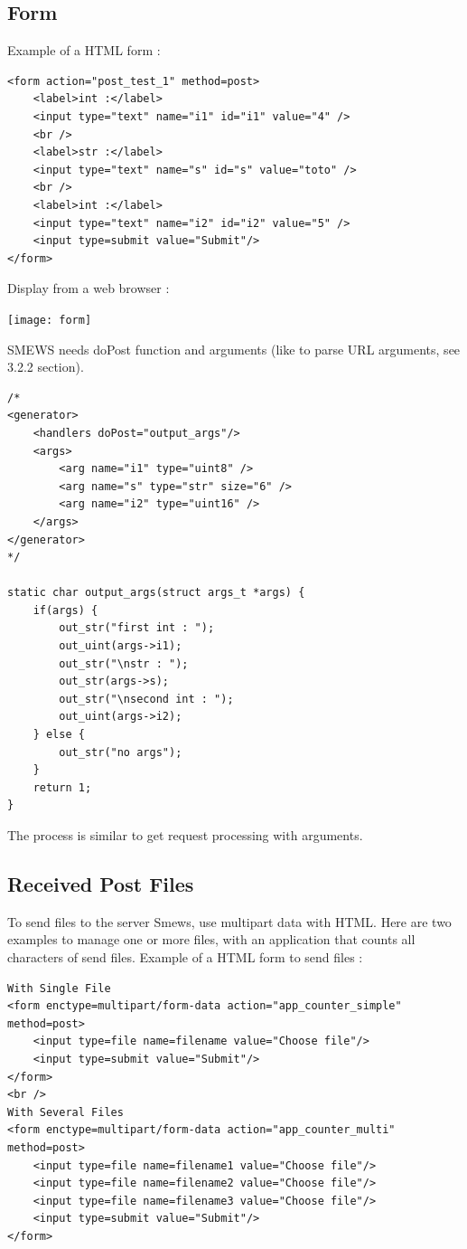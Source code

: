 \documentclass{report}
\begin{document}
\subsection{Form}
Example of a HTML form :

\begin{lstlisting}
<form action="post_test_1" method=post>
	<label>int :</label>
	<input type="text" name="i1" id="i1" value="4" />
	<br />
	<label>str :</label>
	<input type="text" name="s" id="s" value="toto" />
	<br />
	<label>int :</label>
	<input type="text" name="i2" id="i2" value="5" />
	<input type=submit value="Submit"/> 
</form>
\end{lstlisting}

Display from a web browser :
\begin{center}
\texttt{[image: form]}
\end{center}

SMEWS needs doPost function and arguments (like to parse URL arguments, see 3.2.2 section).

\lstset{language=C}
\begin{lstlisting}
/*
<generator>
    <handlers doPost="output_args"/>
    <args>
        <arg name="i1" type="uint8" />
        <arg name="s" type="str" size="6" />
        <arg name="i2" type="uint16" />
    </args>
</generator>
*/

static char output_args(struct args_t *args) {
    if(args) {
        out_str("first int : ");
        out_uint(args->i1);
        out_str("\nstr : ");
        out_str(args->s);
        out_str("\nsecond int : ");
        out_uint(args->i2);
    } else {
        out_str("no args");
    }
    return 1;
}
\end{lstlisting}
The process is similar to get request processing with arguments.

\subsection{Received Post Files}
To send files to the server Smews, use multipart data with HTML. Here are two examples to manage one or more files, with an application that counts all characters of send files.
\newline
\newline
Example of a HTML form to send files :
\begin{lstlisting}
With Single File
<form enctype=multipart/form-data action="app_counter_simple" method=post>
	<input type=file name=filename value="Choose file"/>
	<input type=submit value="Submit"/>
</form>	
<br />
With Several Files
<form enctype=multipart/form-data action="app_counter_multi" method=post>
	<input type=file name=filename1 value="Choose file"/>
	<input type=file name=filename2 value="Choose file"/>
	<input type=file name=filename3 value="Choose file"/>
	<input type=submit value="Submit"/>
</form>
\end{lstlisting}
\end{document}
